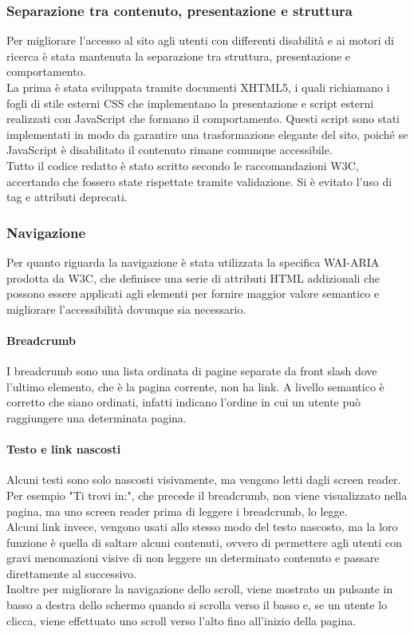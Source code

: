 \subsubsection{Separazione tra contenuto, presentazione e struttura}
Per migliorare l’accesso al sito agli utenti con differenti disabilità e ai motori di ricerca è stata mantenuta la separazione tra struttura, presentazione e comportamento.\\
La prima è stata sviluppata tramite documenti XHTML5, i quali richiamano i fogli di stile esterni CSS che implementano la presentazione e script esterni realizzati con JavaScript che formano il comportamento. Questi script sono stati implementati in modo da garantire una trasformazione elegante del sito, poiché se JavaScript è disabilitato il contenuto rimane comunque accessibile.\\
Tutto il codice redatto è stato scritto secondo le raccomandazioni W3C, accertando che fossero state rispettate tramite validazione. Si è evitato l’uso di tag e attributi deprecati.

\subsubsection{Navigazione} \label{subsection:navigazione}
Per quanto riguarda la navigazione è stata utilizzata la specifica WAI-ARIA prodotta da W3C, che definisce una serie di attributi HTML addizionali che possono essere applicati agli elementi per fornire maggior valore semantico e migliorare l'accessibilità dovunque sia necessario.

\paragraph{Breadcrumb} I breadcrumb sono una lista ordinata di pagine separate da front slash dove l'ultimo elemento, che è la pagina corrente, non ha link. A livello semantico è corretto che siano ordinati, infatti indicano l'ordine in cui un utente può raggiungere una determinata pagina.

\paragraph{Testo e link nascosti} Alcuni testi sono solo nascosti visivamente, ma vengono letti dagli screen reader. Per esempio "Ti trovi in:", che precede il breadcrumb, non viene visualizzato nella pagina, ma uno screen reader prima di leggere i breadcrumb, lo legge.\\
Alcuni link invece, vengono usati allo stesso modo del testo nascosto, ma la loro funzione è quella di saltare alcuni contenuti, ovvero di permettere agli utenti con gravi menomazioni visive di non leggere un determinato contenuto e passare direttamente al successivo.\\
Inoltre per migliorare la navigazione dello scroll, viene mostrato un pulsante in basso a destra dello schermo quando si scrolla verso il basso e, se un utente lo clicca, viene effettuato uno scroll verso l'alto fino all'inizio della pagina.

